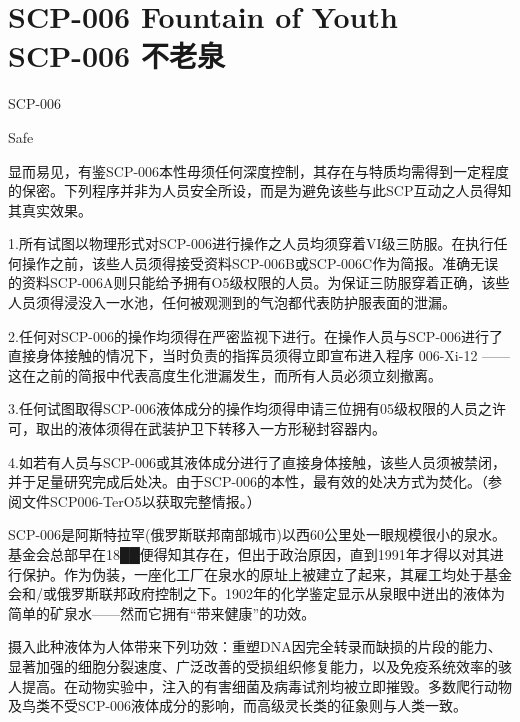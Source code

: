 \chapter[SCP-006 不老泉]{
	SCP-006 Fountain of Youth\\
	SCP-006 不老泉
}

\label{chap:SCP-006}



SCP-006

Safe

显而易见，有鉴SCP-006本性毋须任何深度控制，其存在与特质均需得到一定程度的保密。下列程序并非为人员安全所设，而是为避免该些与此SCP互动之人员得知其真实效果。

1.所有试图以物理形式对SCP-006进行操作之人员均须穿着VI级三防服。在执行任何操作之前，该些人员须得接受资料SCP-006B或SCP-006C作为简报。准确无误的资料SCP-006A则只能给予拥有O5级权限的人员。为保证三防服穿着正确，该些人员须得浸没入一水池，任何被观测到的气泡都代表防护服表面的泄漏。

2.任何对SCP-006的操作均须得在严密监视下进行。在操作人员与SCP-006进行了直接身体接触的情况下，当时负责的指挥员须得立即宣布进入程序 006-Xi-12 ——这在之前的简报中代表高度生化泄漏发生，而所有人员必须立刻撤离。

3.任何试图取得SCP-006液体成分的操作均须得申请三位拥有05级权限的人员之许可，取出的液体须得在武装护卫下转移入一方形秘封容器内。

4.如若有人员与SCP-006或其液体成分进行了直接身体接触，该些人员须被禁闭，并于足量研究完成后处决。由于SCP-006的本性，最有效的处决方式为焚化。（参阅文件SCP006-TerO5以获取完整情报。）

SCP-006是阿斯特拉罕(俄罗斯联邦南部城市)以西60公里处一眼规模很小的泉水。基金会总部早在18██便得知其存在，但出于政治原因，直到1991年才得以对其进行保护。作为伪装，一座化工厂在泉水的原址上被建立了起来，其雇工均处于基金会和/或俄罗斯联邦政府控制之下。1902年的化学鉴定显示从泉眼中迸出的液体为简单的矿泉水——然而它拥有“带来健康”的功效。

摄入此种液体为人体带来下列功效：重塑DNA因完全转录而缺损的片段的能力、显著加强的细胞分裂速度、广泛改善的受损组织修复能力，以及免疫系统效率的骇人提高。在动物实验中，注入的有害细菌及病毒试剂均被立即摧毁。多数爬行动物及鸟类不受SCP-006液体成分的影响，而高级灵长类的征象则与人类一致。

